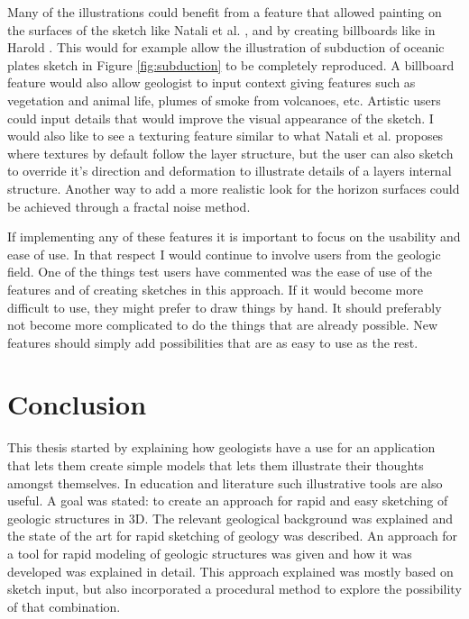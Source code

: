 \documentclass[a4paper,12pt]{report}
\begin{document}
Many of the illustrations could benefit from a feature that allowed painting on the surfaces of the sketch like Natali et al. \cite{natalirapid}, and by creating billboards like in Harold \cite{cohen2000harold}. This would for example allow the illustration of subduction of oceanic plates sketch in Figure \ref{fig:subduction} to be completely reproduced. A billboard feature would also allow geologist to input context giving features such as vegetation and animal life, plumes of smoke from volcanoes, etc. Artistic users could input details that would improve the visual appearance of the sketch. I would also like to see a texturing feature similar to what Natali et al. proposes where textures by default follow the layer structure, but the user can also sketch to override it's direction and deformation to illustrate details of a layers internal structure. Another way to add a more realistic look for the horizon surfaces could be achieved through a fractal noise method.

If implementing any of these features it is important to focus on the usability and ease of use. In that respect I would continue to involve users from the geologic field. One of the things test users have commented was the ease of use of the features and of creating sketches in this approach. If it would become more difficult to use, they might prefer to draw things by hand. It should preferably not become more complicated to do the things that are already possible. New features should simply add possibilities that are as easy to use as the rest.

\clearpage
\chapter{Conclusion}
\label{sec:conclusion}
This thesis started by explaining how geologists have a use for an application that lets them create simple models that lets them illustrate their thoughts amongst themselves. In education and literature such illustrative tools are also useful. A goal was stated: to create an approach for rapid and easy sketching of geologic structures in 3D. The relevant geological background was explained and the state of the art for rapid sketching of geology was described. An approach for a tool for rapid modeling of geologic structures was given and how it was developed was explained in detail. This approach explained was mostly based on sketch input, but also incorporated a procedural method to explore the possibility of that combination.
\end{document}
